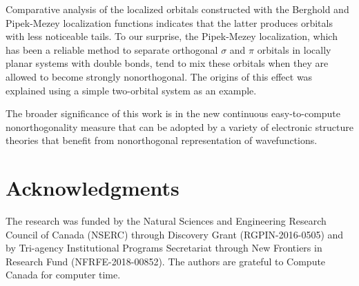 \documentclass[aps,prl,reprint,amsmath,amssymb]{revtex4-1}
\begin{document}
Comparative analysis of the localized orbitals constructed with the Berghold and Pipek-Mezey localization functions indicates that the latter produces orbitals with less noticeable tails. To our surprise, the Pipek-Mezey localization, which has been a reliable method to separate orthogonal $\sigma$ and $\pi$ orbitals in locally planar systems with double bonds, tend to mix these orbitals when they are allowed to become strongly nonorthogonal. The origins of this effect was explained using a simple two-orbital system as an example.

The broader significance of this work is in the new continuous easy-to-compute nonorthogonality measure that can be adopted by a variety of electronic structure theories that benefit from nonorthogonal representation of wavefunctions. %

\section{Acknowledgments} 

The research was funded by the Natural Sciences and Engineering Research Council of Canada (NSERC) through Discovery
Grant (RGPIN-2016-0505) and by Tri-agency Institutional Programs Secretariat through New Frontiers in Research Fund (NFRFE-2018-00852). The authors are grateful to Compute Canada for computer time.



\end{document}
